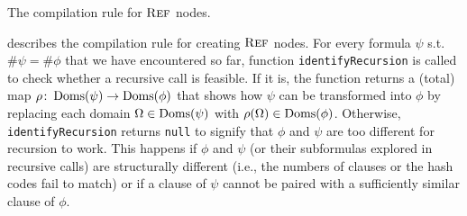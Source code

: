 \begin{algorithm}[t]
  \caption{The compilation rule for $\operatorname{\textsc{Ref}}$ nodes.}\label{alg:trycache}

  \Return{$\emptyset$}\;



\end{algorithm}

 describes the compilation rule for creating $\operatorname{\textsc{Ref}}$ nodes.
For every formula $\psi$ s.t. $\#\psi = \#\phi$ that we have encountered so far,
function \texttt{identifyRecursion} is called to check whether a recursive call
is feasible. If it is, the function returns a (total) map
$\rho\colon \operatorname{Doms}(\psi) \to \operatorname{Doms}(\phi)$ that shows how $\psi$ can be
transformed into $\phi$ by replacing each domain $\Omega \in \operatorname{Doms}(\psi)$ with
$\rho(\Omega) \in \operatorname{Doms}(\phi)$. Otherwise, \texttt{identifyRecursion} returns
\texttt{null} to signify that $\phi$ and $\psi$ are too different for recursion
to work. This happens if $\phi$ and $\psi$ (or their subformulas explored in
recursive calls) are structurally different (i.e., the numbers of clauses or the
hash codes fail to match) or if a clause of $\psi$ cannot be paired with a
sufficiently similar clause of $\phi$.

